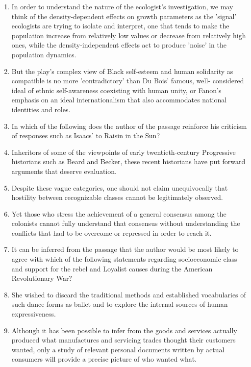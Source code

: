 \begin{enumerate}
\item In order to understand the nature of the ecologist's investigation, we may think of the density-dependent effects on growth parameters as the 'signal' ecologists are trying to isolate and interpret, one that tends to make the population increase from relatively low values or decrease from relatively high ones, while the density-independent effects act to produce 'noise' in the population dynamics. 

\item But the play's complex view of Black self-esteem and human solidarity as
compatible is no more 'contradictory' than Du Bois' famous, well- considered ideal of ethnic self-awareness  coexisting with human unity, or Fanon's emphasis on an ideal internationalism that also accommodates national identities and roles. 

\item In which of the following does the author of the passage reinforce his criticism of responses such as Isaacs' to Raisin in the Sun?  

\item Inheritors of some of the viewpoints of early twentieth-century Progressive historians such as Beard and Becker, these recent historians have put forward arguments that deserve evaluation.

\item Despite these vague categories, one should not claim unequivocally that
hostility between recognizable classes cannot be legitimately observed.

\item Yet those who stress the achievement of a general consensus among the
colonists cannot fully understand that consensus without understanding the conflicts that had to be overcome or repressed in order to reach it.

\item It can be inferred from the passage that the author would be most likely to
agree with which of the following statements regarding socioeconomic class and support for the rebel and Loyalist causes during the American Revolutionary War?  

\item She wished to discard the traditional methods and established vocabularies of such dance forms as ballet and to explore the internal sources of human expressiveness.

\item Although it has been possible to infer from the goods and services
actually produced what manufactures and servicing trades thought their customers wanted, only a study of relevant personal documents written by actual consumers will provide a precise picture of who wanted what.


\end{enumerate}
